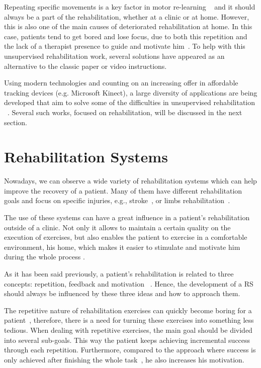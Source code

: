Repeating specific movements is a key factor in motor re-learning ~\cite{Schonauer2011a} and it 
should always be a part of the rehabilitation, whether at a clinic or at home.
However, this is also one of the main causes of deteriorated rehabilitation at home. In this case, patients tend to get bored and lose focus, 
due to both this repetition and the lack of a therapist presence to guide and motivate him~\cite{Singh2014a,Balaam2011a,Rego2010}. 
To help with this unsupervised rehabilitation work, several solutions have appeared as 
an alternative to the classic paper or video instructions. 

Using modern technologies and counting on an increasing offer in 
affordable tracking devices (e.g. Microsoft Kinect), a large
diversity of applications are being developed that aim to solve 
some of the difficulties in unsupervised rehabilitation ~\cite{Kitsunezaki2013,Borghese2013}. Several such works, focused on rehabilitation, will be discussed in the next section.


\section{Rehabilitation Systems}

Nowadays, we can observe a wide variety of rehabilitation systems which can help improve the recovery of a patient. 
Many of them have different rehabilitation goals and focus on specific injuries, e.g., stroke~\cite{Borghese2013,Design2005}, 
or limbs rehabilitation~\cite{Sadihov2013,Burke2009,Klein2013}.

The use of these systems can have a great influence in a patient's rehabilitation outside of a clinic. 
Not only it allows to maintain a certain quality on the execution of exercises, but also enables 
the patient to exercise in a comfortable environment, his home, which makes it easier to stimulate 
and motivate him during the whole process \cite{Borghese2013}.

As it has been said previously, a patient's rehabilitation is related to three concepts: repetition, feedback and motivation ~\cite{Schonauer2011a}. 
Hence, the development of a \ac{RS} should always be influenced by these three ideas and how to approach them. 

The repetitive nature of rehabilitation exercises can quickly become boring for a patient~\cite{Rego2010,Burke2009,Burdea2002}, 
therefore, there is a need for turning these exercises into something less tedious. 
When dealing with repetitive exercises, the main goal should be divided into several sub-goals. 
This way the patient keeps achieving incremental success through each repetition. 
Furthermore, compared to the approach where success is only achieved after finishing the whole task~\cite{Schonauer2011a}, he also increases his motivation.

